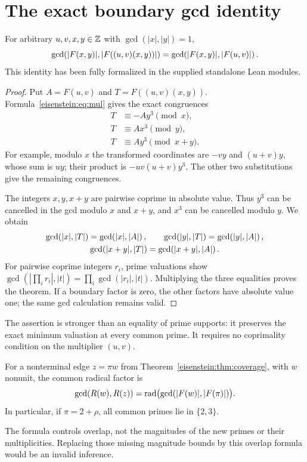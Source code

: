 \section{The exact boundary gcd identity}
\begin{theorem}\label{eisenstein:thm:gcd}
For arbitrary $u,v,x,y\in\mathbb Z$ with $\gcd(|x|,|y|)=1$,
\begin{equation}\label{eisenstein:eq:gcd}
\gcd\!\left(|F(x,y)|,|F((u,v)(x,y))|\right)
=\gcd\!\left(|F(x,y)|,|F(u,v)|\right).
\end{equation}
This identity has been fully formalized in the supplied standalone Lean modules.
\end{theorem}
\begin{proof}
Put $A=F(u,v)$ and $T=F((u,v)(x,y))$. Formula~\eqref{eisenstein:eq:mul} gives the exact congruences
\begin{align}
T&\equiv-Ay^3\pmod{x},\label{eisenstein:eq:remx}\\
T&\equiv Ax^3\pmod{y},\\
T&\equiv Ay^3\pmod{x+y}.
\end{align}
For example, modulo $x$ the transformed coordinates are $-vy$ and $(u+v)y$, whose sum is $uy$; their product is $-uv(u+v)y^3$. The other two substitutions give the remaining congruences.

The integers $x,y,x+y$ are pairwise coprime in absolute value. Thus $y^3$ can be cancelled in the gcd modulo $x$ and $x+y$, and $x^3$ can be cancelled modulo $y$. We obtain
\[
\begin{gathered}
\gcd\!\left(|x|,|T|\right)=\gcd\!\left(|x|,|A|\right),\qquad
\gcd\!\left(|y|,|T|\right)=\gcd\!\left(|y|,|A|\right),\\
\gcd\!\left(|x+y|,|T|\right)=\gcd\!\left(|x+y|,|A|\right).
\end{gathered}
\]
For pairwise coprime integers $r_i$, prime valuations show
$\gcd(|\prod_i r_i|,|t|)=\prod_i\gcd(|r_i|,|t|)$.
Multiplying the three equalities proves the theorem. If a boundary factor is zero, the other factors have absolute value one; the same gcd calculation remains valid.
\end{proof}

The assertion is stronger than an equality of prime supports: it preserves the exact minimum valuation at every common prime. It requires no coprimality condition on the multiplier $(u,v)$.

\begin{corollary}
For a nonterminal edge $z=\pi w$ from Theorem~\ref{eisenstein:thm:coverage}, with $w$ nonunit, the common radical factor is
\[
\gcd(R(w),R(z))=\operatorname{rad}\bigl(\gcd(|F(w)|,|F(\pi)|)\bigr).
\]
In particular, if $\pi=2+\rho$, all common primes lie in $\{2,3\}$.
\end{corollary}
The formula controls overlap, not the magnitudes of the new primes or their multiplicities. Replacing those missing magnitude bounds by this overlap formula would be an invalid inference.

